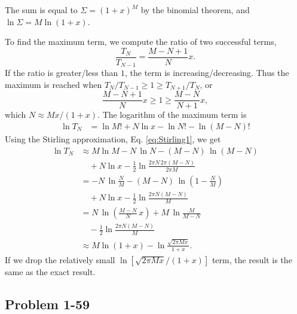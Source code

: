 \documentclass[twocolumn, 10pt]{article}
\numberwithin{equation}{section}
\newenvironment{solution}[1][\empty]
{\par\medskip\sffamily
  \textbf{\ifx\empty#1{Solution.}\relax\else{#1}\fi} \ignorespaces}
{\medskip}
\begin{document}
\begin{solution}
The sum is equal to $\Sigma = (1+x)^M$ by the binomial theorem,
and $\ln \Sigma = M \ln(1+x)$.

To find the maximum term,
we compute the ratio of two successful terms,
$$
  \frac{ T_N } { T_{N - 1} }
  =
  \frac{ M - N + 1 } { N } x.
$$
If the ratio is greater/less than $1$,
the term is increasing/decreasing.
Thus the maximum is reached when
  $T_N/T_{N-1} \ge 1 \ge T_{N+1}/T_N$, or
$$
  \frac{ M - N + 1} { N } x
  \ge 1 \ge
  \frac{ M - N } { N + 1 } x,
$$
which $N \approx M x /(1+x)$.
The logarithm of the maximum term is
\begin{align*}
  \ln T_N
  &= \ln M! + N \ln x - \ln N! - \ln (M-N)!
\end{align*}
%
Using the Stirling approximation, Eq. \eqref{eq:Stirling1},
we get
\begin{align*}
  \ln T_N
  &\approx M \ln M - N \, \ln N - (M - N) \, \ln(M-N) \\
  &\quad + N \ln x
  -\frac{1}{2} \ln\frac{2\pi N \, 2\pi(M-N)}{2\pi M}
  \\
  &=- N \, \ln \frac{N}{M} - (M - N) \, \ln\left(1-\frac{N}{M}\right) \\
  &\quad + N \ln x
  -\frac{1}{2} \ln\frac{2\pi N (M-N)}{M}
  \\
  &=
  N \, \ln\left( \frac{M-N}{N} \, x \right)
  + M \, \ln \frac{M}{M-N}
  \\
  &\quad -\frac{1}{2} \ln\frac{2\pi N (M-N)}{M}
  \\
  &\approx
  M\ln(1+x) - \ln\frac{ \sqrt{2\pi M x} } { 1 + x}
  .
\end{align*}
If we drop the relatively small
$\ln[\sqrt{2\pi M x}/(1 + x)]$ term,
the result is the same as the exact result.
\end{solution}



\subsection{Problem 1-59}
\end{document}
